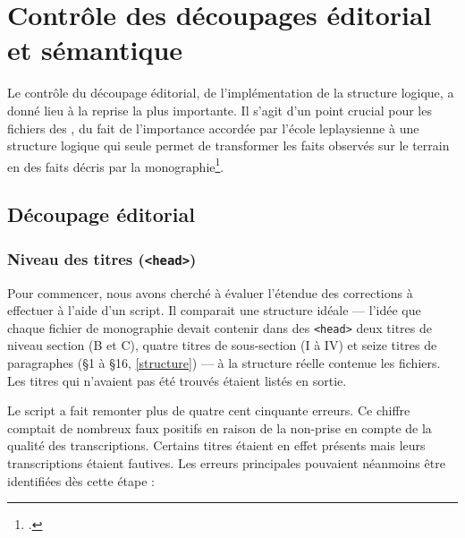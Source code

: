 \chapter[Découpages éditorial et sémantique]{Contrôle des découpages éditorial et sémantique}

Le contrôle du découpage éditorial, \cad{} de l'implémentation de la structure logique, a donné lieu à la reprise la plus importante. Il s'agit d'un point crucial pour les fichiers des \odm, du fait de l'importance accordée par l'école leplaysienne à une structure logique qui seule permet de transformer les \og faits observés \fg{} sur le terrain en des \og faits décris \fg{} par la monographie\footcite[p. 87]{baciocchi2}.

\section{Découpage éditorial}

\subsection{Niveau des titres (\texttt{<head>})}

Pour commencer, nous avons cherché à évaluer l'étendue des corrections à effectuer à l'aide d'un script. Il comparait une structure idéale --- \cad{} l'idée que chaque fichier de monographie devait contenir dans des \texttt{<head>} deux titres de niveau section (B et C), quatre titres de sous-section (I à IV) et seize titres de paragraphes (§1 à §16, \cf{} \ann{} \ref{structure}) --- à la structure réelle contenue les fichiers. Les titres qui n'avaient pas été trouvés étaient listés en sortie.

Le script a fait remonter plus de quatre cent cinquante erreurs. Ce chiffre comptait de nombreux faux positifs en raison de la non-prise en compte de la qualité des transcriptions. Certains titres étaient en effet présents mais leurs transcriptions étaient fautives. Les erreurs principales pouvaient néanmoins être identifiées dès cette étape :


